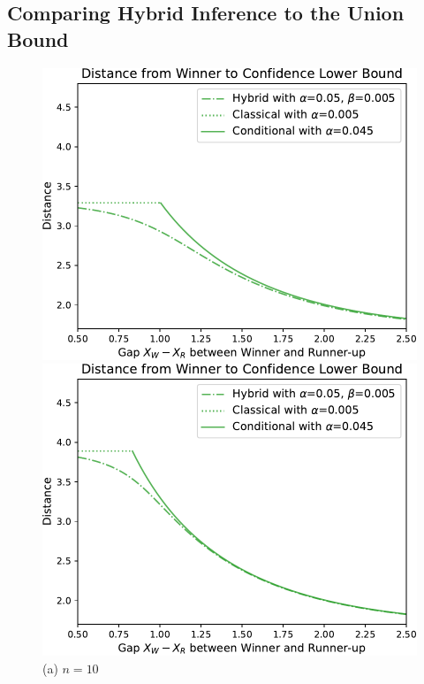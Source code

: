 \documentclass{article}
\begin{document}
\begin{appendix}
\subsection{Comparing Hybrid Inference to the Union Bound}
\label{sec:hybrid_sim_appdx}

\begin{figure}
    \centering
    \hspace{-0.035\textwidth}
    \begin{minipage}{0.32\textwidth}
        \centering
        \includegraphics[width=\textwidth]{fig/hyb_dist_to_winner_n=10.pdf}
        \caption*{(a) $n=10$}
    \end{minipage}
    \hfill
    \hspace{0.01\textwidth}
    \begin{minipage}{0.32\textwidth}
        \centering
        \includegraphics[width=\textwidth]{fig/hyb_dist_to_winner_n=100.pdf}

\end{minipage}
\end{figure}
\end{appendix}
\end{document}
